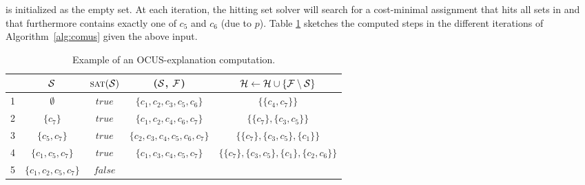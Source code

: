 \begin{example}
	 
\setstohit is initialized as the empty set. At each iteration, the hitting set solver will search for a cost-minimal assignment that hits all sets in \setstohit and that furthermore contains exactly one of $c_5$ and $c_6$ (due to $p$).
	Table \ref{tab:explanation-steps-expanded} sketches the computed steps in the different iterations of Algorithm~\ref{alg:comus} given the above input.
\begin{table}[!h]
	\centering
	\begin{adjustbox}{max width=\columnwidth}
			\begin{tabular}{lcccc} 
				&$\mathcal{S}$ & $\textsc{sat}(\mathcal{S})$ & \grow($\mathcal{S}$, $\mathcal{F} $) & $\mathcal{H}  \gets \mathcal{H}  \cup \{  \mathcal{F}  \setminus \mathcal{S}\}$\\ 
				\toprule[2pt]
				1 &$ \emptyset $ & $\mathit{true}$ & $\{c_1, c_2, c_3, c_5, c_6\}$    & $\{ \{c_4, c_7\}\}$   \\
				\midrule	
				2 &$\{ c_7\}$  &$\mathit{true}$ & $\{ c_1, c_2, c_4, c_6, c_7\}$   & $\{ \{c_7\}, \{c_3, c_5\}\}$  \\  
				\midrule
				3& $\{ c_5,c_7 \}$  & $\mathit{true}$ & $\{c_2, c_3, c_4,c_5, c_6, c_7 \}$  & $\{ \{c_7\},\{c_3, c_5\}, \{c_1\}\}$  \\  
				\midrule
				4& $\{ c_1, c_5, c_7 \}$  & $true$ & $\{c_1, c_3, c_4, c_5, c_7 \}$  & $\{ \{c_7\},\{c_3, c_5\}, \{c_1\}, \{c_2, c_6\}\}$  \\ 
				\midrule
				5&  $\{ c_1, c_2, c_5, c_7 \}$ & $\mathit{false}$ & & \\
			\end{tabular}
	\end{adjustbox}
	\caption{Example of an OCUS-explanation computation.}
	\label{tab:explanation-steps-expanded}
\end{table}
\end{example}

